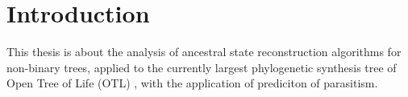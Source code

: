 
\tableofcontents
\clearpage
{}

\chapter{Introduction}
  This thesis is about the analysis of ancestral state reconstruction algorithms for non-binary 
    trees, applied to the currently largest phylogenetic synthesis tree of Open Tree of Life (OTL)
    \cite{Hinchliff2015}, with the application of prediciton of parasitism. \\
  
